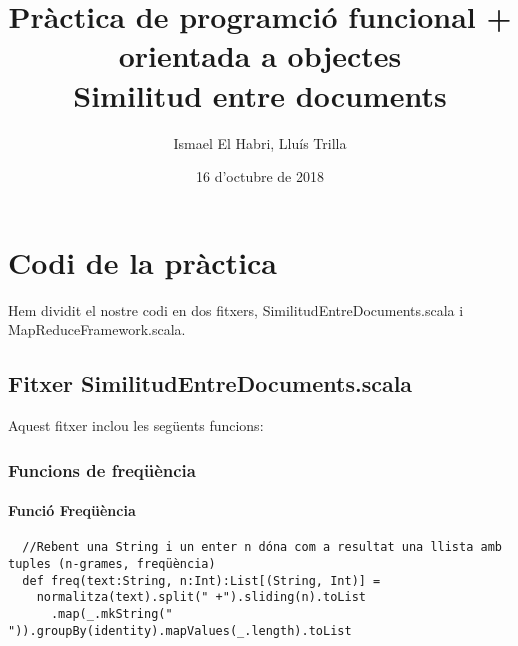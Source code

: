 \documentclass[11pt,a4paper,twoside]{report}
\begin{document}
\title{Pràctica de programció funcional + orientada a objectes\\
\large Similitud entre documents}
\author{Ismael El Habri, Lluís Trilla}
\date{16 d'octubre de 2018}
\maketitle

\tableofcontents

\chapter{Codi de la pràctica}

Hem dividit el nostre codi en dos fitxers, SimilitudEntreDocuments.scala i MapReduceFramework.scala.

\section{Fitxer SimilitudEntreDocuments.scala}

Aquest fitxer inclou les següents funcions:
\subsection{Funcions de freqüència}

\subsubsection{Funció Freqüència}
\begin{lstlisting}
  //Rebent una String i un enter n dóna com a resultat una llista amb tuples (n-grames, freqüència)
  def freq(text:String, n:Int):List[(String, Int)] =
    normalitza(text).split(" +").sliding(n).toList
      .map(_.mkString(" ")).groupBy(identity).mapValues(_.length).toList
\end{lstlisting}
\end{document}
